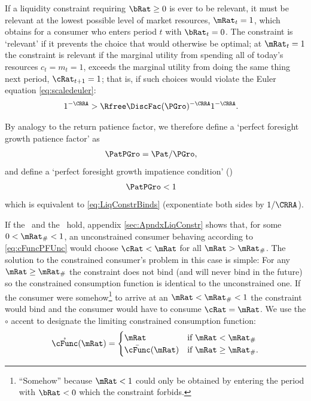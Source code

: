 \documentclass[BufferStockTheory]{subfiles}
\begin{document}
If a liquidity constraint requiring $\bRat \geq 0$ is ever to be relevant, it must be
relevant at the lowest possible level of market resources,
$\mRat_{t}=1$, which obtains for a consumer who enters period $t$ with
$\bRat_{t}=0$.  The constraint is `relevant' if
it prevents the choice that would otherwise be optimal; at
$\mRat_{t}=1$ the constraint is relevant if the marginal utility from spending all of today's
resources $c_{t}=m_{t}=1$, exceeds the marginal utility from
doing the same thing next period, $\cRat_{t+1}=1$; that is, if such
choices would violate the Euler equation \eqref{eq:scaledeuler}:
\begin{align}
  1^{-\CRRA}  & > \Rfree \DiscFac (\PGro)^{-\CRRA}1^{-\CRRA}  \label{eq:LiqConstrBinds}.
\end{align}

\hypertarget{PFGPF}{}
\hypertarget{PFGIC}{}
By analogy to the return patience factor, we therefore define a `perfect
foresight growth patience factor' as
\begin{align}
  \PatPGro  & = {\Pat}/\PGro,  \label{eq:PFGPF}
\end{align}
and define a `perfect foresight growth impatience condition' (\PFGIC)
\begin{align}
  \label{eq:PFGIC}
  \PatPGro &  < 1
\end{align}
which is equivalent to \eqref{eq:LiqConstrBinds} (exponentiate both
sides by $1/\CRRA$).

If the \RIC~and the \FHWC~hold, appendix \ref{sec:ApndxLiqConstr} shows
that, for some $0 < \mRat_{\#} < 1$, an unconstrained consumer behaving according to
\eqref{eq:cFuncPFUnc} would choose $\cRat < \mRat$ for all $\mRat >
\mRat_{\#}$.  The solution to the
constrained consumer's problem in this case is simple: For any $\mRat
\geq \mRat_{\#}$ the constraint does not bind (and will never bind in
the future) so the constrained consumption function is identical
to the unconstrained one.  If the consumer were somehow\footnote{``Somehow'' because $\mRat<1$ could only be
  obtained by entering the period with $\bRat < 0$ which the constraint
  forbids.}
to arrive at an $\mRat < \mRat_{\#} < 1$ the constraint would bind and
the consumer would have to consume $\cRat=\mRat$.  We use the $\circ$ accent to designate the limiting
constrained consumption function:
\begin{equation}
  \mathring{\cFunc}(\mRat)=
  \begin{cases}
    \mRat & \text{if $\mRat < \mRat_{\#}$} \\
    \bar{\cFunc}(\mRat)  & \text{if $\mRat \geq \mRat_{\#}$.}
  \end{cases}
\end{equation}
\end{document}
